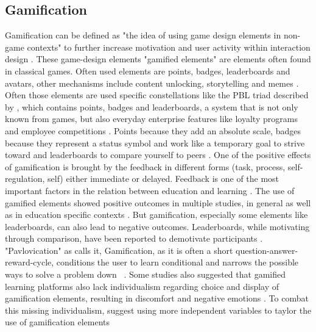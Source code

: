 \subsection{Gamification}
Gamification can be defined as "the idea of using game design elements in non-game contexts" \>\parencite{deterdingGameDesignElements2011} to further increase motivation and user activity within interaction design \parencite{deterdingGameDesignElements2011}.
These game-design elements "gamified elements" are elements often found in classical games. Often used elements are points, badges, leaderboards and avatars, other mechanisms include content unlocking, storytelling and memes \parencite{zainuddinImpactGamificationLearning2020}.
Often those elements are used specific constellations like the PBL triad described by \cite{werbachWinHowGame2012}, which contains points, badges and leaderboards, a system that is not only known from games, but also everyday enterprise features like loyalty programs and employee competitions \parencite{werbachWinHowGame2012}.
Points because they add an absolute scale, badges because they represent a status symbol and work like a temporary goal to strive toward and leaderboards to compare yourself to peers \parencite{werbachWinHowGame2012}.
One of the positive effects of gamification is brought by the feedback in different forms (task, process, self-regulation, self) either immediate or delayed. Feedback is one of the most important factors in the relation between education and learning \cite{sailerGamificationLearningMetaanalysis2020}.
The use of gamified elements showed positive outcomes in multiple studies, in general \parencite{hamariDoesGamificationWork2014} as well as in education specific contexts \parencite{sailerGamificationLearningMetaanalysis2020}.
But gamification, especially some elements like leaderboards, can also lead to negative outcomes. Leaderboards, while motivating through comparison, have been reported to demotivate participants \parencite{almeidaSystematicMappingNegative2021}.
"Pavlovication" as \cite{klabbersArchitectureGameScience2018} calls it, Gamification, as it is often a short question-answer-reward-cycle, conditions the user to learn conditional and narrows the possible ways to solve a problem down ~\parencite{klabbersArchitectureGameScience2018}.
Some studies also suggested that gamified learning platforms also lack individualism regarding choice and display of gamification elements, resulting in discomfort and negative emotions \parencite{santosDoesGenderStereotype2023}.
To combat this missing individualism, \Textcite{oliveiraTailoredGamificationEducation2023,dehghanzadehUsingGamificationSupport2024} suggest using more independent variables to taylor the use of gamification elements

